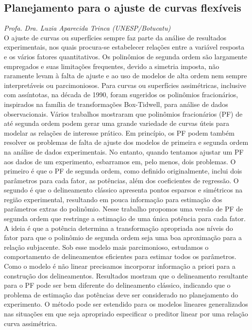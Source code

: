 \documentclass[twoside, a4paper]{article}
\begin{document}
\subsection*{Planejamento para o ajuste de curvas flexíveis}
\vspace{-0.2cm}
\textit{\large Profa. Dra. Luzia Aparecida Trinca
  (UNESP/Botucatu)}\\[0.3cm]
O ajuste de curvas ou superfícies sempre faz parte da análise de
resultados experimentais, nos quais procura-se estabelecer relações
entre a variável resposta e os vários fatores quantitativos. Os
polinômios de segunda ordem são largamente empregados e suas limitações
frequentes, devido a simetria imposta, não raramente levam à falta de
ajuste e ao uso de modelos de alta ordem nem sempre interpretáveis ou
parcimoniosos. Para curvas ou superfícies assimétricas, inclusive com
assíntotas, na década de 1990, foram sugeridos os polinômios
fracionários, inspirados na família de transformações Box-Tidwell, para
análise de dados observacionais. Vários trabalhos mostraram que
polinômios fracionários (PF) de até segunda ordem podem gerar uma grande
variedade de curvas úteis para modelar as relações de interesse
prático. Em princípio, os PF podem também resolver os problemas de falta
de ajuste dos modelos de primeira e segunda ordem na análise de dados
experimentais. No entanto, quando tentamos ajustar um PF aos dados de um
experimento, esbarramos em, pelo menos, dois problemas. O primeiro é que
o PF de segunda ordem, como definido originalmente, inclui dois
parâmetros para cada fator, as potências, além dos coeficientes de
regressão. O segundo é que o delineamento clássico apresenta pontos
esparsos e simétricos na região experimental, resultando em pouca
informação para estimação dos parâmetros extras do polinômio. Nesse
trabalho propomos uma versão de PF de segunda ordem que restringe a
estimação de uma única potência para cada fator. A ideia é que a
potência determina a transformação apropriada aos níveis do fator para
que o polinômio de segunda ordem seja uma boa aproximação para a relação
subjacente. Sob esse modelo mais parcimonioso, estudamos o comportamento
de delineamentos eficientes para estimar todos os parâmetros. Como o
modelo é não linear precisamos incorporar informação a priori para a
construção dos delineamentos. Resultados mostram que o delineamento
resultante para o PF pode ser bem diferente do delineamento clássico,
indicando que o problema de estimação das potências deve ser considerado
no planejamento do experimento. O método pode ser estendido para os
modelos lineares generalizados nas situações em que seja apropriado
especificar o preditor linear por uma relação curva assimétrica.
\vspace{.2cm}
\end{document}
